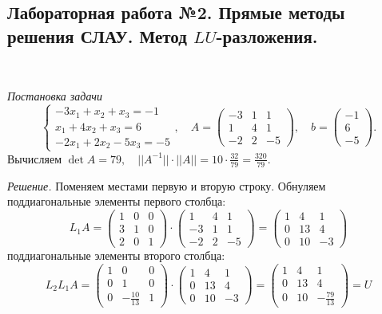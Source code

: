 \documentclass[9pt]{article}
\begin{document}
\subsection{Лабораторная работа №2. Прямые методы решения СЛАУ. Метод \(LU\)-разложения.}

\par\ 
\par\textit{Постановка задачи}\[\left\{
\begin{array}{l}
    -3x_1+x_2+x_3=-1\\
    x_1+4x_2+x_3=6\\
    -2x_1+2x_2-5x_3=-5
\end{array}
\right.,\quad A=\left(
\begin{array}{ccc}
    -3 & 1 & 1\\
    1 & 4 & 1\\
    -2 & 2 & -5
\end{array}
\right),\quad b=\left(
\begin{array}{c}
    -1\\
    6\\
    -5
\end{array}\right).\]
Вычисляем \(\det A = 79,\quad ||A^{-1}||\cdot||A||=10\cdot\frac{32}{79}=\frac{320}{79}\).
\par\textit{Решение.} Поменяем местами первую и вторую строку. Обнуляем поддиагональные элементы первого столбца:
\[L_1A=\left(
\begin{array}{ccc}
    1 & 0 & 0\\
    3 & 1 & 0\\
    2 & 0 & 1
\end{array}
\right)\cdot\left(
\begin{array}{ccc}
    1 & 4 & 1\\
    -3 & 1 & 1\\
    -2 & 2 & -5
\end{array}
\right)=\left(
\begin{array}{ccc}
    1 & 4 & 1\\
    0 & 13 & 4\\
    0 & 10 & -3
\end{array}
\right)
\]
 поддиагональные элементы второго столбца:
\[L_2L_1A=\left(
\begin{array}{ccc}
    1 & 0 & 0\\
    0 & 1 & 0\\
    0 & -\frac{10}{13} & 1
\end{array}
\right)\cdot\left(
\begin{array}{ccc}
    1 & 4 & 1\\
    0 & 13 & 4\\
    0 & 10 & -3
\end{array}
\right)=\left(
\begin{array}{ccc}
    1 & 4 & 1\\
    0 & 13 & 4\\
    0 & 10 & -\frac{79}{13}
\end{array}
\right)=U\]
\end{document}
